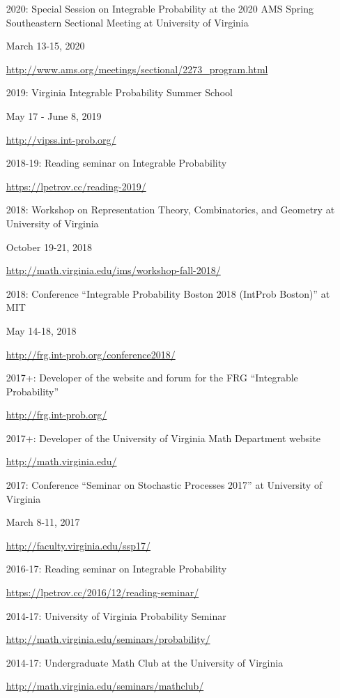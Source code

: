 \documentclass[letterpaper,11pt]{article}
\begin{document}
\begin{itemize}
	\item [2020:]
		Special Session on Integrable Probability
		at the 2020 AMS Spring Southeastern Sectional Meeting at 
		University of Virginia
		
		March 13-15, 2020

		\url{http://www.ams.org/meetings/sectional/2273_program.html}

	\item [2019:]
		Virginia Integrable Probability Summer School
		
		May 17 - June 8, 2019

		\url{http://vipss.int-prob.org/}

	\item[2018-19:]
	      Reading seminar on Integrable Probability

	      \url{https://lpetrov.cc/reading-2019/}
		
	\item [2018:]
		Workshop on Representation Theory, Combinatorics, and Geometry
		at University of
		Virginia
		
		October 19-21, 2018
	
		\url{http://math.virginia.edu/ims/workshop-fall-2018/}

	\item [2018:]
		Conference 
		``Integrable Probability Boston 2018 (IntProb Boston)''
		at MIT

		May 14-18, 2018
	
		\url{http://frg.int-prob.org/conference2018/}


	\item [2017+:]
		Developer of the website and forum for the FRG ``Integrable Probability''

		\url{http://frg.int-prob.org/}

	\item [2017+:]
		Developer of the University of Virginia Math Department website

		\url{http://math.virginia.edu/}
	\item
	      [2017:] Conference
	      ``Seminar on Stochastic Processes 2017'' at University of
		Virginia
		
		March 8-11, 2017

	      \url{http://faculty.virginia.edu/ssp17/}
	\item
	      [2016-17:]
	      Reading seminar on Integrable Probability

	      \url{https://lpetrov.cc/2016/12/reading-seminar/}
	\item
	      [2014-17:] University of Virginia Probability Seminar

	      \url{http://math.virginia.edu/seminars/probability/}
	\item
	      [2014-17:]
	      Undergraduate Math Club at the University of Virginia

	      \url{http://math.virginia.edu/seminars/mathclub/}
\end{itemize}
\end{document}
